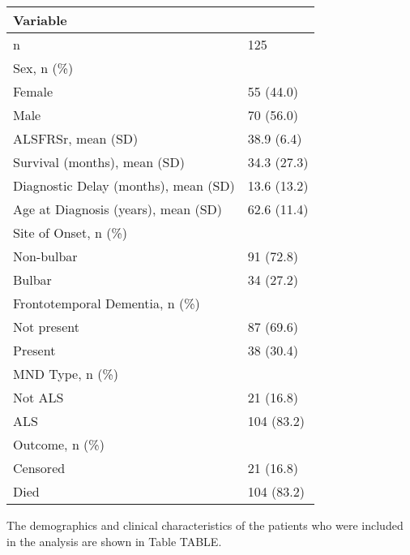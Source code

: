 \begin{table}
\centering
\caption{}
\label{tab:coxdemographics}
\begin{tabular}{|ll|}
\hline
              Variable                          &      \\
\hline
 n                               & 125         \\\hline
 Sex, n (\%)          & \\
 \hspace{5mm}Female & 55 (44.0)   \\
\hspace{5mm}Male & 70 (56.0)   \\\hline
 ALSFRSr, mean (SD)                 & 38.9 (6.4)  \\\hline
 Survival (months), mean (SD)         & 34.3 (27.3) \\\hline
 Diagnostic Delay (months), mean (SD)  & 13.6 (13.2) \\\hline
 Age at Diagnosis (years), mean (SD)  & 62.6 (11.4) \\\hline
 Site of Onset, n (\%)        &  \\
 \hspace{5mm}Non-bulbar   & 91 (72.8)   \\
 \hspace{5mm}Bulbar  & 34 (27.2)   \\\hline
 Frontotemporal Dementia, n (\%)       & \\
 \hspace{5mm}Not present & 87 (69.6)   \\
\hspace{5mm}Present & 38 (30.4)   \\\hline
 MND Type, n (\%)                & \\
 \hspace{5mm}Not ALS   & 21 (16.8)   \\
 \hspace{5mm}ALS   & 104 (83.2)  \\\hline
 Outcome, n (\%)                          & \\
 \hspace{5mm}Censored   & 21 (16.8)   \\
\hspace{5mm}Died   & 104 (83.2)  \\\hline

\end{tabular}
\end{table}

The demographics and clinical characteristics of the patients who were included in the analysis are shown in Table TABLE.

